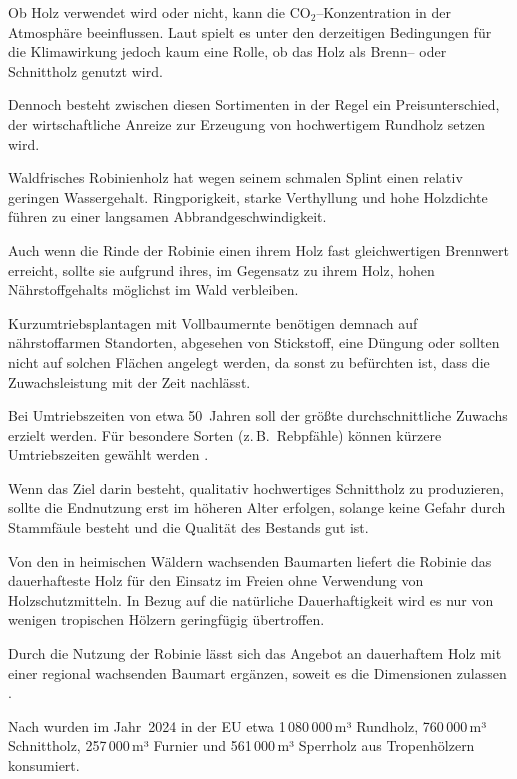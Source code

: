 \documentclass[twocolumn]{scrartcl}
\begin{document}
Ob Holz verwendet wird oder nicht, kann die CO$_2$--Konzentration in
der Atmosphäre beeinflussen. Laut
\citet{boiger2024schnittholzBrennholz} spielt es unter den derzeitigen
Bedingungen für die Klimawirkung jedoch kaum eine Rolle, ob das Holz
als Brenn-- oder Schnittholz genutzt wird.

Dennoch besteht zwischen diesen Sortimenten in der Regel ein
Preisunterschied, der wirtschaftliche Anreize zur Erzeugung von
hochwertigem Rundholz setzen wird.

Waldfrisches Robinienholz hat wegen seinem schmalen Splint einen
relativ geringen Wassergehalt. Ringporigkeit, starke Verthyllung und
hohe Holzdichte führen zu einer langsamen Abbrandgeschwindigkeit.

Auch wenn die Rinde der Robinie einen ihrem Holz fast gleichwertigen
Brennwert erreicht, sollte sie aufgrund ihres, im Gegensatz zu ihrem
Holz, hohen Nährstoffgehalts möglichst im Wald verbleiben.

Kurzumtriebsplantagen mit Vollbaumernte benötigen demnach auf
nährstoffarmen Standorten, abgesehen von Stickstoff, eine Düngung oder
sollten nicht auf solchen Flächen angelegt werden, da sonst zu
befürchten ist, dass die Zuwachsleistung mit der Zeit nachlässt.

Bei Umtriebszeiten von etwa 50~Jahren soll der größte
durchschnittliche Zuwachs erzielt werden. Für besondere Sorten
(z.\,B.\ Rebpfähle) können kürzere Umtriebszeiten gewählt werden
\citep[S.~136]{erteld1952robinieErtrag}.

Wenn das Ziel darin besteht, qualitativ hochwertiges Schnittholz zu
produzieren, sollte die Endnutzung erst im höheren Alter erfolgen,
solange keine Gefahr durch Stammfäule besteht und die Qualität des
Bestands gut ist.

Von den in heimischen Wäldern wachsenden Baumarten liefert die Robinie
das dauerhafteste Holz für den Einsatz im Freien ohne Verwendung von
Holzschutzmitteln. In Bezug auf die natürliche Dauerhaftigkeit wird es
nur von wenigen tropischen Hölzern geringfügig übertroffen.

Durch die Nutzung der Robinie lässt sich das Angebot an dauerhaftem
Holz mit einer regional wachsenden Baumart ergänzen, soweit es die
Dimensionen zulassen
\citep{benthien2020robinieTropenholz,sari2005robinienholz}.

Nach \citet{itto2024biennial} wurden im Jahr~2024 in der EU etwa
1\,080\,000\,m³ Rundholz, 760\,000\,m³ Schnittholz, 257\,000\,m³
Furnier und 561\,000\,m³ Sperrholz aus Tropenhölzern konsumiert.
\end{document}
